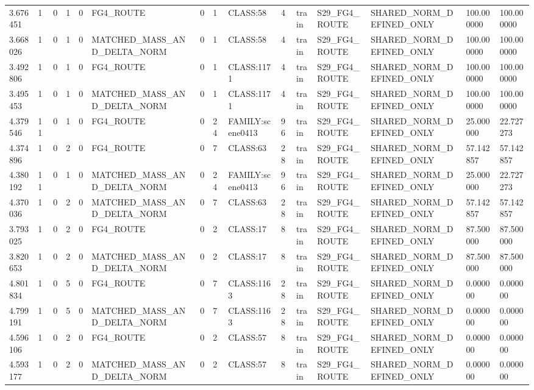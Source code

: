 \begin{tabular}{lllllllllllllll}
3.676451 & 1 & 0 & 1 & 0 & FG4\_ROUTE & 0 & 1 & CLASS:58 & 4 & train & S29\_FG4\_ROUTE & SHARED\_NORM\_DEFINED\_ONLY & 100.000000 & 100.000000 \\
3.668026 & 1 & 0 & 1 & 0 & MATCHED\_MASS\_AND\_DELTA\_NORM & 0 & 1 & CLASS:58 & 4 & train & S29\_FG4\_ROUTE & SHARED\_NORM\_DEFINED\_ONLY & 100.000000 & 100.000000 \\
3.492806 & 1 & 0 & 1 & 0 & FG4\_ROUTE & 0 & 1 & CLASS:1171 & 4 & train & S29\_FG4\_ROUTE & SHARED\_NORM\_DEFINED\_ONLY & 100.000000 & 100.000000 \\
3.495453 & 1 & 0 & 1 & 0 & MATCHED\_MASS\_AND\_DELTA\_NORM & 0 & 1 & CLASS:1171 & 4 & train & S29\_FG4\_ROUTE & SHARED\_NORM\_DEFINED\_ONLY & 100.000000 & 100.000000 \\
4.379546 & 11 & 0 & 1 & 0 & FG4\_ROUTE & 0 & 24 & FAMILY:scene0413 & 96 & train & S29\_FG4\_ROUTE & SHARED\_NORM\_DEFINED\_ONLY & 25.000000 & 22.727273 \\
4.374896 & 1 & 0 & 2 & 0 & FG4\_ROUTE & 0 & 7 & CLASS:63 & 28 & train & S29\_FG4\_ROUTE & SHARED\_NORM\_DEFINED\_ONLY & 57.142857 & 57.142857 \\
4.380192 & 11 & 0 & 1 & 0 & MATCHED\_MASS\_AND\_DELTA\_NORM & 0 & 24 & FAMILY:scene0413 & 96 & train & S29\_FG4\_ROUTE & SHARED\_NORM\_DEFINED\_ONLY & 25.000000 & 22.727273 \\
4.370036 & 1 & 0 & 2 & 0 & MATCHED\_MASS\_AND\_DELTA\_NORM & 0 & 7 & CLASS:63 & 28 & train & S29\_FG4\_ROUTE & SHARED\_NORM\_DEFINED\_ONLY & 57.142857 & 57.142857 \\
3.793025 & 1 & 0 & 2 & 0 & FG4\_ROUTE & 0 & 2 & CLASS:17 & 8 & train & S29\_FG4\_ROUTE & SHARED\_NORM\_DEFINED\_ONLY & 87.500000 & 87.500000 \\
3.820653 & 1 & 0 & 2 & 0 & MATCHED\_MASS\_AND\_DELTA\_NORM & 0 & 2 & CLASS:17 & 8 & train & S29\_FG4\_ROUTE & SHARED\_NORM\_DEFINED\_ONLY & 87.500000 & 87.500000 \\
4.801834 & 1 & 0 & 5 & 0 & FG4\_ROUTE & 0 & 7 & CLASS:1163 & 28 & train & S29\_FG4\_ROUTE & SHARED\_NORM\_DEFINED\_ONLY & 0.000000 & 0.000000 \\
4.799191 & 1 & 0 & 5 & 0 & MATCHED\_MASS\_AND\_DELTA\_NORM & 0 & 7 & CLASS:1163 & 28 & train & S29\_FG4\_ROUTE & SHARED\_NORM\_DEFINED\_ONLY & 0.000000 & 0.000000 \\
4.596106 & 1 & 0 & 2 & 0 & FG4\_ROUTE & 0 & 2 & CLASS:57 & 8 & train & S29\_FG4\_ROUTE & SHARED\_NORM\_DEFINED\_ONLY & 0.000000 & 0.000000 \\
4.593177 & 1 & 0 & 2 & 0 & MATCHED\_MASS\_AND\_DELTA\_NORM & 0 & 2 & CLASS:57 & 8 & train & S29\_FG4\_ROUTE & SHARED\_NORM\_DEFINED\_ONLY & 0.000000 & 0.000000 \\

\end{tabular}
